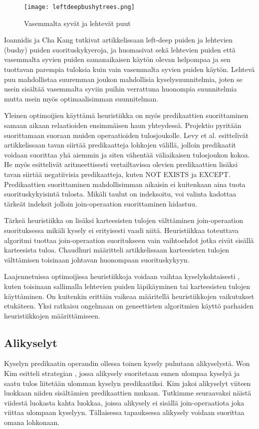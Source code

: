 \documentclass[finnish]{tktltiki2}
\theoremstyle{definition}
\theoremstyle{remark}
\begin{document}
\begin{figure}[!h]
  \caption{Vasemmalta syvät ja lehtevät puut}
  \centering
    \texttt{[image: leftdeepbushytrees.png]}
\end{figure}

Ioannidis ja Cha Kang tutkivat artikkelissaan \cite{ioannidis1991left} left-deep puiden ja lehtevien (bushy) puiden suorituskykyeroja, ja huomasivat sekä lehtevien puiden että vasemmalta syvien puiden samanaikaisen käytön olevan helpompaa ja sen tuottavan parempia tuloksia kuin vain vasemmalta syvien puiden käytön. Lehtevä puu mahdollistaa suuremman joukon mahdollisia kyselysuunnitelmia, joten se usein sisältää vasemmalta syviin puihin verrattuna huonompia suunnitelmia mutta usein myös optimaalisimman suunnitelman.

Yleinen optimoijien käyttämä heuristiikka on myös predikaattien suorittaminen samaan aikaan relaatioiden ensimmäisen haun yhteydessä. Projektio pyritään suorittamaan suoraan muiden operaatioiden tulosjoukolle. Levy et al. esittelivät artikkelissaan \cite{levy1994query} tavan siirtää predikaatteja lohkojen välillä, jolloin predikaatit voidaan suorittaa yhä aiemmin ja siten vähentää väliaikaisen tulosjoukon kokoa. He myös esittelivät aritmeettisesti vertailtavissa olevien predikaattien lisäksi tavan siirtää negatiivisia predikaatteja, kuten NOT EXISTS ja EXCEPT. Predikaattien suorittaminen mahdollisimman aikaisin ei kuitenkaan aina tuota suorituskykyisintä tulosta. \cite{ramakrishnan2003database} Mikäli taulut on indeksoitu, voi valinta kadottaa tärkeät indeksit jolloin join-operaation suorittaminen hidastuu.

Tärkeä heuristiikka on lisäksi karteesisten tulojen välttäminen join-operaation suorituksessa mikäli kysely ei erityisesti vaadi niitä. Heuristiikkaa toteuttava algoritmi tuottaa join-operaation suoritukseen vain vaihtoehdot jotka eivät sisällä karteesista tuloa. Chaudhuri määritteli artikkelissaan \cite{chaudhuri1998} karteesisten tulojen välttämisen toisinaan johtavan huonompaan suorituskykyyn. 

Laajennetuissa optimoijissa heuristiikkoja voidaan vaihtaa kyselykohtaisesti \cite{chaudhuri1998}, kuten toisinaan sallimalla lehtevien puiden läpikäyminen tai karteesisten tulojen käyttäminen. On kuitenkin erittäin vaikeaa määritellä heuristiikkojen vaikutukset etukäteen. Yksi ratkaisu ongelmaan on geneettisten algoritmien \cite{bennett1991genetic} käyttö parhaiden heuristiikkojen määrittämiseen.
\subsection{Alikyselyt}
Kyselyn predikaatin operandin ollessa toinen kysely puhutaan alikyselystä. Won Kim esitteli strategian \cite{kim1982optimizing}, jossa alikysely suoritetaan ennen ulompaa kyselyä ja saatu tulos liitetään ulomman kyselyn predikaatiksi. Kim jakoi alikyselyt viiteen luokkaan niiden sisältämien predikaattien mukaan. Tutkimme seuraavaksi näistä viidestä luokasta kahta luokkaa, joissa alikysely ei sisällä join-operaatiota joka viittaa ulompaan kyselyyn. Tällaisessa tapauksessa alikysely voidaan suorittaa omana lohkonaan. 
\newline
\end{document}
